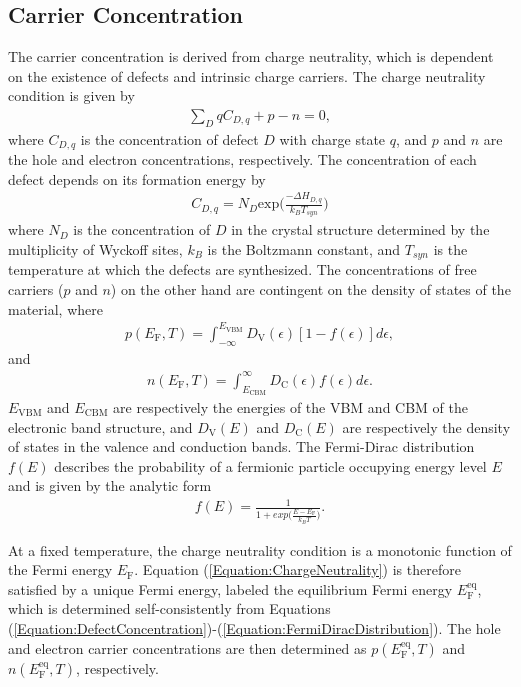 \documentclass[%
 reprint,
 amsmath,amssymb,
 aps,
]{revtex4-1}
\begin{document}
\subsection{Carrier Concentration}
The carrier concentration is derived from charge neutrality, which is dependent on the existence of defects and intrinsic charge carriers. The charge neutrality condition is given by
\begin{align} \label{Equation:ChargeNeutrality}
\sum_{D} q C_{D,q} + p - n = 0,
\end{align}
where $C_{D,q}$ is the concentration of defect $D$ with charge state $q$, and $p$ and $n$ are the hole and electron concentrations, respectively. The concentration of each defect depends on its formation energy by
\begin{align} \label{Equation:DefectConcentration}
C_{D,q}=N_D \text{exp} \bigg(\frac{-\Delta H_{D,q}}{k_B T_{syn}} \bigg)
\end{align}
where $N_D$ is the concentration of $D$ in the crystal structure determined by the multiplicity of Wyckoff sites, $k_B$ is the Boltzmann constant, and $T_{syn}$ is the temperature at which the defects are synthesized. The concentrations of free carriers ($p$ and $n$) on the other hand are contingent on the density of states of the material, where
\begin{align} \label{Equation:HoleConcentration}
p(E_{\text{F}}, T) = \int_{-\infty}^{E_{\text{VBM}}} D_{\text{V}}(\epsilon) [1 - f(\epsilon)] d\epsilon,
\end{align}
and
\begin{align} \label{Equation:ElectronConcentration}
n(E_{\text{F}}, T) = \int_{E_{\text{CBM}}}^{\infty} D_{\text{C}}(\epsilon) f(\epsilon) d\epsilon.
\end{align}
$E_{\text{VBM}}$ and $E_{\text{CBM}}$ are respectively the energies of the VBM and CBM of the electronic band structure, and $D_{\text{V}}(E)$ and $D_{\text{C}}(E)$ are respectively the density of states in the valence and conduction bands. The Fermi-Dirac distribution $f(E)$ describes the probability of a fermionic particle occupying energy level $E$ and is given by the analytic form
\begin{align} \label{Equation:FermiDiracDistribution}
f(E) = \frac{1}{1 + exp\big(\frac{E-E_{\text{F}}}{k_B T}\big)}.
\end{align}

At a fixed temperature, the charge neutrality condition is a monotonic function of the Fermi energy $E_{\text{F}}$. Equation (\ref{Equation:ChargeNeutrality}) is therefore satisfied by a unique Fermi energy, labeled the equilibrium Fermi energy $E_{\text{F}}^{\text{eq}}$, which is determined self-consistently from Equations (\ref{Equation:DefectConcentration})-(\ref{Equation:FermiDiracDistribution}). The hole and electron carrier concentrations are then determined as $p(E_{\text{F}}^{\text{eq}}, T)$ and $n(E_{\text{F}}^{\text{eq}}, T)$, respectively.
\end{document}
